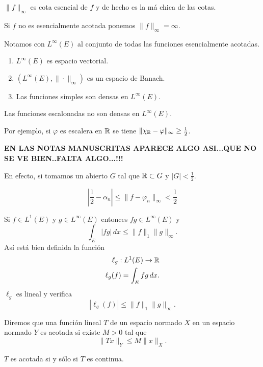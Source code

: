 \begin{ejercicio}{}
$\|f\|_{\infty}$ es cota esencial de $f$ y de hecho es la m\'a chica de las cotas.
\end{ejercicio}


Si $f$ no es esencialmente acotada ponemos $\|f\|_{\infty}=\infty$.

Notamos con $L^{\infty}(E)$ al conjunto de todas las funciones esencialmente acotadas.

\begin{ejercicio}{}
\begin{enumerate}
    \item $L^{\infty}(E)$ es espacio vectorial.
    \item $\left(L^{\infty}(E),\|\cdot\|_{\infty}\right)$ es un espacio de Banach.
    \item Las funciones simples son densas en $L^{\infty}(E)$.
\end{enumerate}
\end{ejercicio}

\begin{ejemplo}{}
Las funciones escalonadas no son densas  en $L^{\infty}(E)$.

Por ejemplo, si $\varphi$ es escalera en $\mathbb{R}$ se tiene  $\|\chi_{\mathbb{R}}-\varphi\|_{\infty}\geq \frac{1}{2}$. 

\textbf{EN LAS NOTAS MANUSCRITAS APARECE ALGO ASI...QUE NO SE VE BIEN..FALTA ALGO...!!!}

En efecto, si tomamos un abierto $G$ tal que $\mathbb{R}\subset G$ y $|G|<\frac{1}{2}$.

\[ 
\left|\frac{1}{2}-\alpha_n\right|\leq \|f-\varphi_n \|_{\infty}<\frac{1}{2}
\]
\end{ejemplo}

Si $f\in L^1(E)$ y $g \in L^{\infty}(E)$ entonces $fg\in L^{\infty}(E)$
y 
\[
\int_E |fg|\,dx \leq \|f\|_1\|g\|_{\infty}.
\]
As\'i est\'a bien definida la funci\'on 
\[
\begin{split}
\ell_g:L^1(E)\to \mathbb{R}\\
\ell_g(f)=\int_E fg\,dx.
\end{split}
\]
$\ell_g$ es lineal y verifica 
\[
|\ell_g(f)|\leq \|f\|_1 \|g\|_{\infty}.
\]

Diremos que una funci\'on lineal $T$ de un espacio normado $X$ en un espacio normado $Y$ es acotada si existe $M>0$ tal que 
\[
\|Tx\|_Y \leq M \|x\|_X.
\]

\begin{proposicion}{}
$T$ es acotada si y s\'olo si $T$ es continua.
\end{proposicion}

